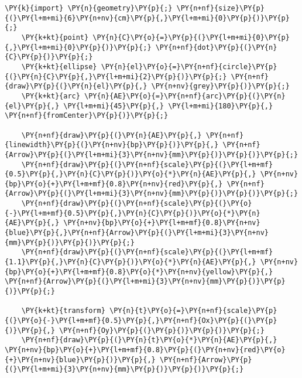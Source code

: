 \begin{Verbatim}[commandchars=\\\{\}]
    \PY{k}{import} \PY{n}{geometry}\PY{p}{;} \PY{n+nf}{size}\PY{p}{(}\PY{l+m+mi}{6}\PY{n+nv}{cm}\PY{p}{,}\PY{l+m+mi}{0}\PY{p}{)}\PY{p}{;}
    \PY{k+kt}{point} \PY{n}{C}\PY{o}{=}\PY{p}{(}\PY{l+m+mi}{0}\PY{p}{,}\PY{l+m+mi}{0}\PY{p}{)}\PY{p}{;} \PY{n+nf}{dot}\PY{p}{(}\PY{n}{C}\PY{p}{)}\PY{p}{;}
    \PY{k+kt}{ellipse} \PY{n}{el}\PY{o}{=}\PY{n+nf}{circle}\PY{p}{(}\PY{n}{C}\PY{p}{,}\PY{l+m+mi}{2}\PY{p}{)}\PY{p}{;} \PY{n+nf}{draw}\PY{p}{(}\PY{n}{el}\PY{p}{,} \PY{n+nv}{grey}\PY{p}{)}\PY{p}{;}
    \PY{k+kt}{arc} \PY{n}{AE}\PY{o}{=}\PY{n+nf}{arc}\PY{p}{(}\PY{n}{el}\PY{p}{,} \PY{l+m+mi}{45}\PY{p}{,} \PY{l+m+mi}{180}\PY{p}{,} \PY{n+nf}{fromCenter}\PY{p}{)}\PY{p}{;}

    \PY{n+nf}{draw}\PY{p}{(}\PY{n}{AE}\PY{p}{,} \PY{n+nf}{linewidth}\PY{p}{(}\PY{n+nv}{bp}\PY{p}{)}\PY{p}{,} \PY{n+nf}{Arrow}\PY{p}{(}\PY{l+m+mi}{3}\PY{n+nv}{mm}\PY{p}{)}\PY{p}{)}\PY{p}{;}
    \PY{n+nf}{draw}\PY{p}{(}\PY{n+nf}{scale}\PY{p}{(}\PY{l+m+mf}{0.5}\PY{p}{,}\PY{n}{C}\PY{p}{)}\PY{o}{*}\PY{n}{AE}\PY{p}{,} \PY{n+nv}{bp}\PY{o}{+}\PY{l+m+mf}{0.8}\PY{n+nv}{red}\PY{p}{,} \PY{n+nf}{Arrow}\PY{p}{(}\PY{l+m+mi}{3}\PY{n+nv}{mm}\PY{p}{)}\PY{p}{)}\PY{p}{;}
    \PY{n+nf}{draw}\PY{p}{(}\PY{n+nf}{scale}\PY{p}{(}\PY{o}{-}\PY{l+m+mf}{0.5}\PY{p}{,}\PY{n}{C}\PY{p}{)}\PY{o}{*}\PY{n}{AE}\PY{p}{,} \PY{n+nv}{bp}\PY{o}{+}\PY{l+m+mf}{0.8}\PY{n+nv}{blue}\PY{p}{,}\PY{n+nf}{Arrow}\PY{p}{(}\PY{l+m+mi}{3}\PY{n+nv}{mm}\PY{p}{)}\PY{p}{)}\PY{p}{;}
    \PY{n+nf}{draw}\PY{p}{(}\PY{n+nf}{scale}\PY{p}{(}\PY{l+m+mf}{1.1}\PY{p}{,}\PY{n}{C}\PY{p}{)}\PY{o}{*}\PY{n}{AE}\PY{p}{,} \PY{n+nv}{bp}\PY{o}{+}\PY{l+m+mf}{0.8}\PY{o}{*}\PY{n+nv}{yellow}\PY{p}{,} \PY{n+nf}{Arrow}\PY{p}{(}\PY{l+m+mi}{3}\PY{n+nv}{mm}\PY{p}{)}\PY{p}{)}\PY{p}{;}

    \PY{k+kt}{transform} \PY{n}{t}\PY{o}{=}\PY{n+nf}{scale}\PY{p}{(}\PY{o}{-}\PY{l+m+mf}{0.5}\PY{p}{,}\PY{n+nf}{Ox}\PY{p}{(}\PY{p}{)}\PY{p}{,} \PY{n+nf}{Oy}\PY{p}{(}\PY{p}{)}\PY{p}{)}\PY{p}{;}
    \PY{n+nf}{draw}\PY{p}{(}\PY{n}{t}\PY{o}{*}\PY{n}{AE}\PY{p}{,} \PY{n+nv}{bp}\PY{o}{+}\PY{l+m+mf}{0.8}\PY{p}{(}\PY{n+nv}{red}\PY{o}{+}\PY{n+nv}{blue}\PY{p}{)}\PY{p}{,} \PY{n+nf}{Arrow}\PY{p}{(}\PY{l+m+mi}{3}\PY{n+nv}{mm}\PY{p}{)}\PY{p}{)}\PY{p}{;}
\end{Verbatim}
